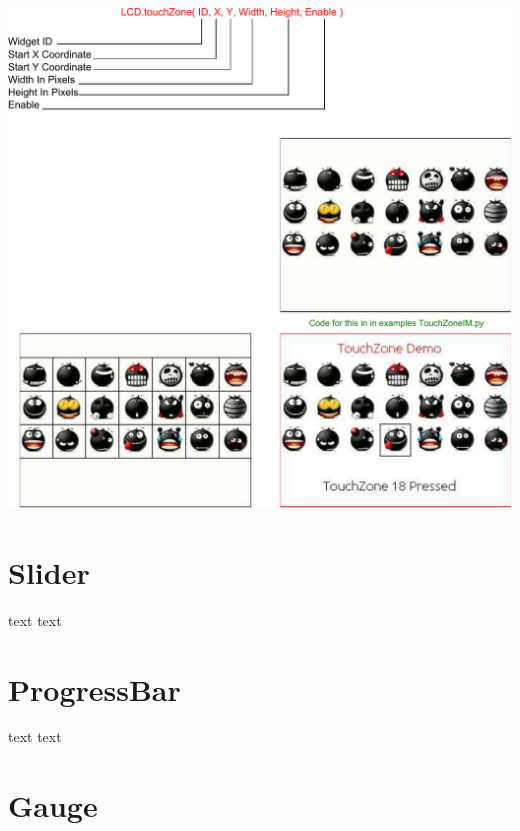 \begin{DoxyImageNoCaption}
  \mbox{\includegraphics{TouchZone}}
\end{DoxyImageNoCaption}
 \hypertarget{d0/d90/intro_widgets_slider}{}\section{Slider}\label{d0/d90/intro_widgets_slider}
text text\par
 \hypertarget{d0/d90/intro_widgets_progressBar}{}\section{Progress\-Bar}\label{d0/d90/intro_widgets_progressBar}
text text\par
 \hypertarget{d0/d90/intro_widgets_gauge}{}\section{Gauge}\label{d0/d90/intro_widgets_gauge}
 
